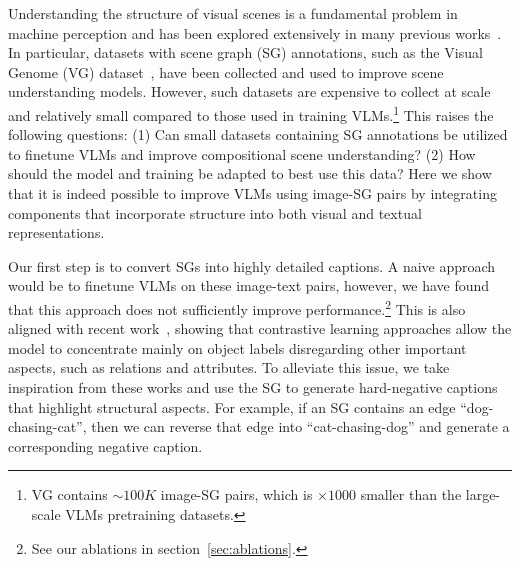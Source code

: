 \documentclass[11pt]{article}
\def\secref#1{section~\ref{#1}}
\begin{document}
Understanding the structure of visual scenes is a fundamental problem in machine perception and has been explored extensively in many previous works~\cite{sg_generation_msg_pass,herzig2019canonical,Yang2022PanopticSG}. In particular, datasets with scene graph (SG) annotations, such as the Visual Genome (VG) dataset~\cite{krishna2017visual}, have been collected and used to improve scene understanding models. However, such datasets are expensive to collect at scale and relatively small compared to those used in training VLMs.\footnote{VG contains $\sim100K$ image-SG pairs, which is $\times 1000$ smaller than the large-scale VLMs pretraining datasets.} This raises the following questions: (1) Can small datasets containing SG annotations be utilized to finetune VLMs and improve compositional scene understanding? (2) How should the model and training be adapted to best use this data? Here we show that it is indeed possible to improve VLMs using image-SG pairs by integrating components that incorporate structure into both visual and textual representations.

























Our first step is to convert SGs into highly detailed captions. A naive approach would be to finetune VLMs on these image-text pairs, however, we have found that this approach does not sufficiently improve performance.\footnote{See our ablations in \secref{sec:ablations}.} This is also aligned with recent work~\cite{doveh2022teaching,yuksekgonul2023when}, showing that contrastive learning approaches allow the model to concentrate mainly on object labels disregarding other important aspects, such as relations and attributes. To alleviate this issue, we take inspiration from these works and use the SG to generate hard-negative captions that highlight structural aspects. For example, if an SG contains an edge ``dog-chasing-cat'', then we can reverse that edge into ``cat-chasing-dog'' and generate a corresponding negative caption. 
\end{document}
